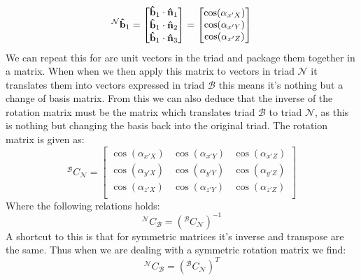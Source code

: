 \documentclass[11pt, a4paper]{article}
\DeclareRobustCommand{\uvec}[1]{{%
  \ifcat\relax\noexpand#1%
    \bm{\hat{#1}}%
  \else
    \ifcsname uvec#1\endcsname
      \csname uvec#1\endcsname
    \else
      \bm{\hat{\mathbf{#1}}}%
     \fi
   \fi
}}
\numberwithin{equation}{section}
\numberwithin{figure}{section}
\begin{document}
\begin{equation}
  ^\mathcal{N}\uvec{b}_1 = 
  \begin{bmatrix}
    \uvec{b}_1 \cdot \uvec{n}_1\\
    \uvec{b}_1 \cdot \uvec{n}_2\\
    \uvec{b}_1 \cdot \uvec{n}_3
  \end{bmatrix}
  =
  \begin{bmatrix}
    \cos(\alpha_{x'X})\\
    \cos(\alpha_{x'Y})\\
    \cos(\alpha_{x'Z})
  \end{bmatrix}
\end{equation}
We can repeat this for are unit vectors in the triad and package them together in a matrix. When when we then apply this matrix to vectors in triad $\mathcal{N}$ it translates them into vectors expressed in triad $\mathcal{B}$ this means it's nothing but a change of basis matrix. From this we can also deduce that the inverse of the rotation matrix must be the matrix which translates triad $\mathcal{B}$ to triad $\mathcal{N}$, as this is nothing but changing the basis back into the original triad. The rotation matrix is given as:
\begin{equation}
  ^\mathcal{B}C_\mathcal{N} = 
  \begin{bmatrix}
      \cos(\alpha_{x'X}) & \cos(\alpha_{x'Y}) & \cos(\alpha_{x'Z})\\
      \cos(\alpha_{y'X}) & \cos(\alpha_{y'Y}) & \cos(\alpha_{y'Z})\\
      \cos(\alpha_{z'X}) & \cos(\alpha_{z'Y}) & \cos(\alpha_{z'Z})\\
  \end{bmatrix}
\end{equation}
Where the following relations holds:
\begin{equation}
  ^\mathcal{N}C_\mathcal{B} = \left(^\mathcal{B}C_\mathcal{N}\right)^{-1}
\end{equation}
A shortcut to this is that for symmetric matrices it's inverse and transpose are the same. Thus when we are dealing with a symmetric rotation matrix we find:
\begin{equation}
  ^\mathcal{N}C_\mathcal{B} = \left(^\mathcal{B}C_\mathcal{N}\right)^T
\end{equation}
\end{document}
